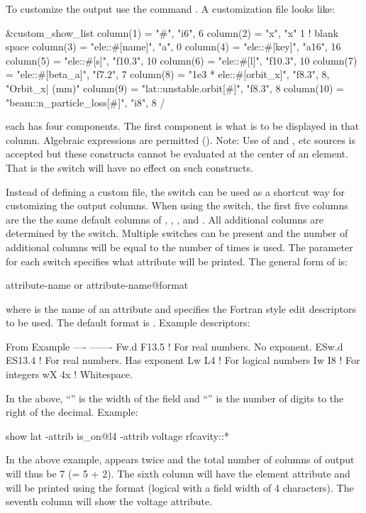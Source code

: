 {{{{{To customize the output use the command . A
customization file looks like:
\begin{example}
  &custom_show_list
    column(1)  = "#",                      "i6",     6 
    column(2)  = "x",                      "x"       1   ! blank space
    column(3)  = "ele::#[name]",           "a",      0
    column(4)  = "ele::#[key]",            "a16",   16
    column(5)  = "ele::#[s]",              "f10.3", 10
    column(6)  = "ele::#[l]",              "f10.3", 10
    column(7)  = "ele::#[beta_a]",         "f7.2",   7
    column(8)  = "1e3 * ele::#[orbit_x]",  "f8.3",   8, "Orbit_x| (mm)" 
    column(9)  = "lat::unstable.orbit[#]", "f8.3",   8 
    column(10) = "beam::n_particle_loss[#]", "i8",   8 
  /
\end{example}
each  has four components. The first component is what is to be displayed in
that column. Algebraic expressions are permitted (). Note: Use of
 and , etc sources is accepted but these constructs cannot be
evaluated at the center of an element. That is the  switch will have no effect
on such constructs.

Instead of defining a custom file, the  switch can be used as a
shortcut way for customizing the output columns.  When using the  switch,
the first five columns are the the same default columns of , ,
,  and . All additional columns are determined by the
 switch. Multiple  switches can be present and the number of
additional columns will be equal to the number of times  is used.  The
 parameter for each  switch specifies what attribute will be
printed.  The general form of  is:
\begin{example}
  attribute-name         or
  attribute-name@format
\end{example}
where  is the name of an attribute and  specifies the Fortran style
edit descriptors to be used. The default format is . Example descriptors:
\begin{example}
  From   Example
  ----   -------
  Fw.d   F13.5    ! For real numbers. No exponent. 
  ESw.d  ES13.4   ! For real numbers. Has exponent
  Lw     L4       ! For logical numbers
  Iw     I8       ! For integers
  wX     4x       ! Whitespace. 
\end{example}
In the above, ``'' is the width of the field and ``'' is the number of digits to
the right of the decimal. Example:
\begin{example}
  show lat -attrib is_on@l4 -attrib voltage rfcavity::*
\end{example}
In the above example,  appears twice and the total number of columns of output will
thus be 7 (= 5 + 2). The sixth column will have the  element attribute and will be printed
using the  format (logical with a field width of 4 characters). The seventh column will show
the voltage attribute.

}}}}}
